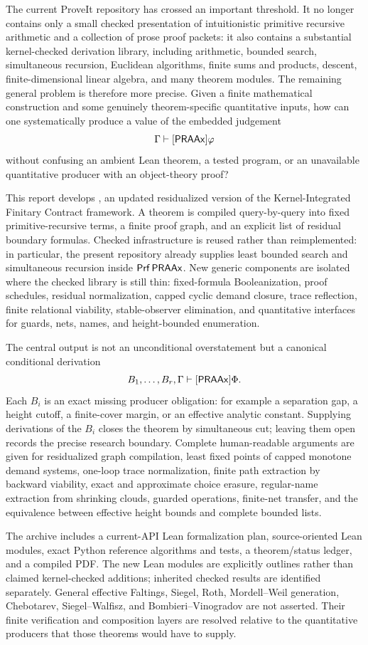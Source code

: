 The current ProveIt repository has crossed an important threshold.  It no longer contains only a small checked presentation of intuitionistic primitive recursive arithmetic and a collection of prose proof packets: it also contains a substantial kernel-checked derivation library, including arithmetic, bounded search, simultaneous recursion, Euclidean algorithms, finite sums and products, descent, finite-dimensional linear algebra, and many theorem modules.  The remaining general problem is therefore more precise.  Given a finite mathematical construction and some genuinely theorem-specific quantitative inputs, how can one systematically produce a value of the embedded judgement
\[
  \Gamma\vdash[\mathsf{PRAAx}]\varphi
\]
without confusing an ambient Lean theorem, a tested program, or an unavailable quantitative producer with an object-theory proof?

This report develops \KIFCR, an updated residualized version of the Kernel-Integrated Finitary Contract framework.  A theorem is compiled query-by-query into fixed primitive-recursive terms, a finite proof graph, and an explicit list of residual boundary formulas.  Checked infrastructure is reused rather than reimplemented: in particular, the present repository already supplies least bounded search and simultaneous recursion inside \(\mathsf{Prf}\,\mathsf{PRAAx}\).  New generic components are isolated where the checked library is still thin: fixed-formula Booleanization, proof schedules, residual normalization, capped cyclic demand closure, trace reflection, finite relational viability, stable-observer elimination, and quantitative interfaces for guards, nets, names, and height-bounded enumeration.

The central output is not an unconditional overstatement but a canonical conditional derivation
\[
  B_1,\ldots,B_r,\Gamma\vdash[\mathsf{PRAAx}]\Phi.
\]
Each \(B_i\) is an exact missing producer obligation: for example a separation gap, a height cutoff, a finite-cover margin, or an effective analytic constant.  Supplying derivations of the \(B_i\) closes the theorem by simultaneous cut; leaving them open records the precise research boundary.  Complete human-readable arguments are given for residualized graph compilation, least fixed points of capped monotone demand systems, one-loop trace normalization, finite path extraction by backward viability, exact and approximate choice erasure, regular-name extraction from shrinking clouds, guarded operations, finite-net transfer, and the equivalence between effective height bounds and complete bounded lists.

The archive includes a current-API Lean formalization plan, source-oriented Lean modules, exact Python reference algorithms and tests, a theorem/status ledger, and a compiled PDF.  The new Lean modules are explicitly outlines rather than claimed kernel-checked additions; inherited checked results are identified separately.  General effective Faltings, Siegel, Roth, Mordell--Weil generation, Chebotarev, Siegel--Walfisz, and Bombieri--Vinogradov are not asserted.  Their finite verification and composition layers are resolved relative to the quantitative producers that those theorems would have to supply.
